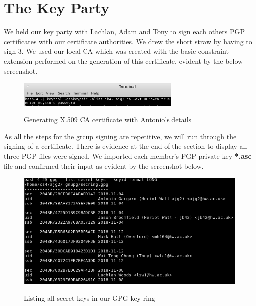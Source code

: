 \section{The Key Party}

We held our key party with Lachlan, Adam and Tony to sign each others PGP certificates with our certificate authorities. We drew the short straw by having to sign 3. We used our local CA which was created with the basic constraint extension performed on the generation of this certificate, evident by the below screenshot.

\begin{figure}[hbt!]
	\centering
      \includegraphics[width=0.7\textwidth]{imgs/x509_creation/ca_x509_creation.PNG} \\
	\caption{Generating X.509 CA certificate with Antonio's details}
	\label{fig:x509_creation:ca}
    \noindent\makebox[\linewidth]{}
\end{figure}

\noindent As all the steps for the group signing are repetitive, we will run through the signing of a certificate. There is evidence at the end of the section to display all three PGP files were signed. We imported each member's PGP private key \textbf{*.asc} file and confirmed their input as evident by the screenshot below.

\begin{figure}[hbt!]
	\centering
      \includegraphics[width=\textwidth]{imgs/key_signing/PGP_Key_List.PNG} \\
	\caption{Listing all secret keys in our GPG key ring}
	\label{fig:key_part:keys_list}
    \noindent\makebox[\linewidth]{}
\end{figure}

